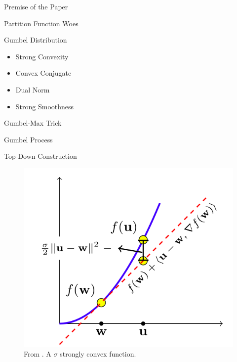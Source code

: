 \begin{frame}{Premise of the Paper}
\end{frame}

\begin{frame}{Partition Function Woes}
\end{frame}

\begin{frame}{Gumbel Distribution}
  \begin{itemize}
  \item Strong Convexity
  \item Convex Conjugate
  \item Dual Norm
  \item Strong Smoothness
  \end{itemize}
\end{frame}

\begin{frame}{Gumbel-Max Trick}
  
\end{frame}

\begin{frame}{Gumbel Process}
\end{frame}

\begin{frame}{Top-Down Construction}
  \begin{figure}
    \includegraphics[scale=0.27]{images/str_convex.png}
    \caption{From \cite{ShSh2012}. A $\sigma$ strongly convex function.}
  \end{figure}
\end{frame}
